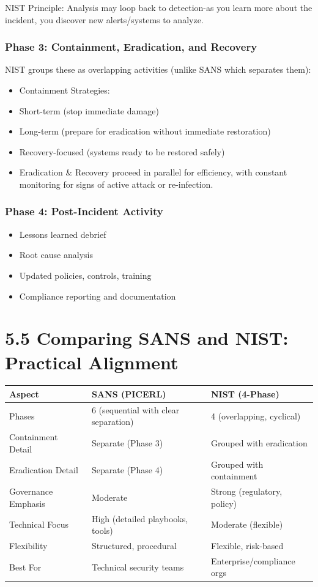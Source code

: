 \documentclass[10pt]{article}
\begin{document}
NIST Principle: Analysis may loop back to detection-as you learn more about the incident, you discover new alerts/systems to analyze.

\subsubsection*{Phase 3: Containment, Eradication, and Recovery}
NIST groups these as overlapping activities (unlike SANS which separates them):

\begin{itemize}
  \item Containment Strategies:
  \item Short-term (stop immediate damage)
  \item Long-term (prepare for eradication without immediate restoration)
  \item Recovery-focused (systems ready to be restored safely)
  \item Eradication \& Recovery proceed in parallel for efficiency, with constant monitoring for signs of active attack or re-infection.
\end{itemize}

\subsubsection*{Phase 4: Post-Incident Activity}
\begin{itemize}
  \item Lessons learned debrief
  \item Root cause analysis
  \item Updated policies, controls, training
  \item Compliance reporting and documentation
\end{itemize}

\section*{5.5 Comparing SANS and NIST: Practical Alignment}
\begin{center}
\begin{tabular}{|l|l|l|}
\hline
Aspect & SANS (PICERL) & NIST (4-Phase) \\
\hline
Phases & 6 (sequential with clear separation) & 4 (overlapping, cyclical) \\
\hline
Containment Detail & Separate (Phase 3) & Grouped with eradication \\
\hline
Eradication Detail & Separate (Phase 4) & Grouped with containment \\
\hline
Governance Emphasis & Moderate & Strong (regulatory, policy) \\
\hline
Technical Focus & High (detailed playbooks, tools) & Moderate (flexible) \\
\hline
Flexibility & Structured, procedural & Flexible, risk-based \\
\hline
Best For & Technical security teams & Enterprise/compliance orgs \\
\hline
\end{tabular}
\end{center}
\end{document}
